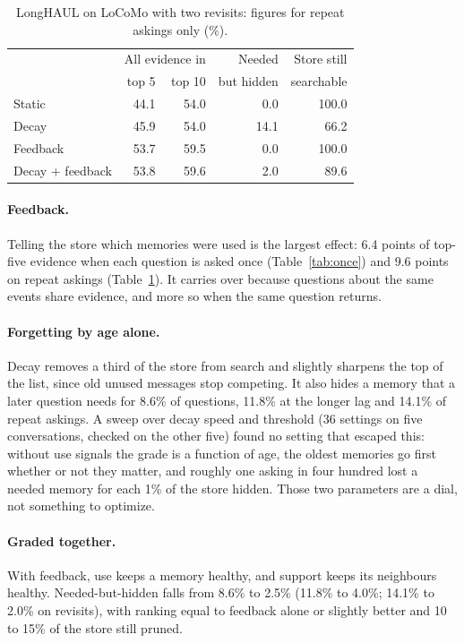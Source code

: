\documentclass[11pt]{article}
\begin{document}
\begin{table}[t]
\centering
\small
\begin{tabular}{lrrrr}
\toprule
 & \multicolumn{2}{c}{All evidence in} & Needed & Store still \\
 & top 5 & top 10 & but hidden & searchable \\
\midrule
Static & 44.1 & 54.0 & 0.0 & 100.0 \\
Decay & 45.9 & 54.0 & 14.1 & 66.2 \\
Feedback & 53.7 & 59.5 & 0.0 & 100.0 \\
Decay + feedback & 53.8 & 59.6 & 2.0 & 89.6 \\
\bottomrule
\end{tabular}
\caption{LongHAUL on LoCoMo with two revisits: figures for repeat
askings only (\%).}
\label{tab:revisit}
\end{table}

\paragraph{Feedback.} Telling the store which memories were used is
the largest effect: 6.4 points of top-five evidence when each question
is asked once (Table~\ref{tab:once}) and 9.6 points on repeat askings
(Table~\ref{tab:revisit}). It carries over because questions about
the same events share evidence, and more so when the same question
returns.

\paragraph{Forgetting by age alone.} Decay removes a third of the
store from search and slightly sharpens the top of the list, since old
unused messages stop competing. It also hides a memory that a later
question needs for 8.6\% of questions, 11.8\% at the longer lag and
14.1\% of repeat askings. A sweep over decay speed and threshold
(36 settings on five conversations, checked on the other five) found
no setting that escaped this: without use signals the grade is a
function of age, the oldest memories go first whether or not they
matter, and roughly one asking in four hundred lost a needed memory
for each 1\% of the store hidden. Those two parameters are a dial, not
something to optimize.

\paragraph{Graded together.} With feedback, use keeps a memory
healthy, and support keeps its neighbours healthy. Needed-but-hidden
falls from 8.6\% to 2.5\% (11.8\% to 4.0\%; 14.1\% to 2.0\% on
revisits), with ranking equal to feedback alone or slightly better
and 10 to 15\% of the store still pruned.
\end{document}
